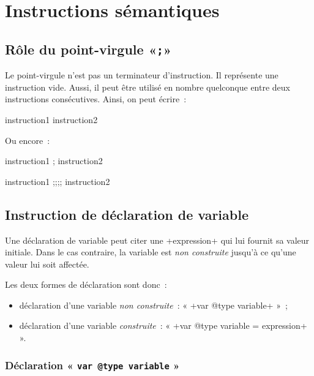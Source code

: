 
\chapter{Instructions sémantiques}




\section{Rôle du point-virgule «\texttt{;}»}

Le point-virgule n'est pas un terminateur d'instruction. Il représente une instruction vide. Aussi, il peut être utilisé en nombre quelconque entre deux instructions consécutives. Ainsi, on peut écrire~:

\begin{galgas}
instruction1  instruction2
\end{galgas}

Ou encore~:
\begin{galgas}
instruction1 ; instruction2
\end{galgas}
\begin{galgas}
instruction1 ;;;; instruction2
\end{galgas}







\section{Instruction de déclaration de variable}


Une déclaration de variable peut citer une \ggs+expression+ qui lui fournit sa valeur initiale. Dans le cas contraire, la variable est \emph{non construite} jusqu'à ce qu'une valeur lui soit affectée.

Les deux formes de déclaration sont donc~:
\begin{itemize}
\item déclaration d'une variable \emph{non construite}~: « \ggs+var @type variable+ »~;
\item déclaration d'une variable \emph{construite}~: « \ggs+var @type variable = expression+ ».
\end{itemize}


\subsection{Déclaration « \texttt{var @type variable} »}

